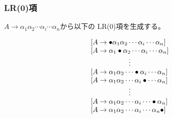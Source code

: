 \documentclass[dvipdfmx]{beamer}
\begin{document}
\begin{frame}
\end{frame}



\begin{frame}
  \frametitle{LR(0)項}
  $A\rightarrow\alpha_1\alpha_2\cdots\alpha_i\cdots\alpha_n$から以下の
  LR(0)項を生成する。

  \[
    \begin{array}{l}%
      [A\rightarrow\bullet\alpha_1\alpha_2\cdots\alpha_i\cdots\alpha_n] \\\relax
      [A\rightarrow\alpha_1\bullet\alpha_2\cdots\alpha_i\cdots\alpha_n] \\
      \multicolumn{1}{c}{\vdots}                                        \\\relax
      [A\rightarrow\alpha_1\alpha_2\cdots\bullet\alpha_i\cdots\alpha_n] \\\relax
      [A\rightarrow\alpha_1\alpha_2\cdots\alpha_i\bullet\cdots\alpha_n] \\
      \multicolumn{1}{c}{\vdots}                                        \\\relax
      [A\rightarrow\alpha_1\alpha_2\cdots\alpha_i\cdots\bullet\alpha_n] \\\relax
      [A\rightarrow\alpha_1\alpha_2\cdots\alpha_i\cdots\alpha_n\bullet] \\\relax
    \end{array}
  \]

\end{frame}
\end{document}
